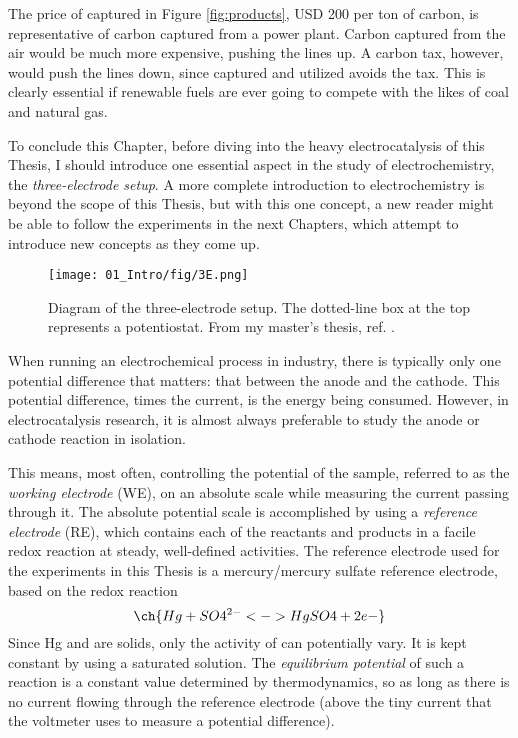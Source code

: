 The price of captured  in Figure \ref{fig:products}, USD 200 per ton of carbon, is representative of carbon captured from a power plant\cite{Majumdar2016}. Carbon captured from the air would be much more expensive, pushing the lines up. A carbon tax, however, would push the lines down, since captured and utilized  avoids the tax. This is clearly essential if renewable fuels are ever going to compete with the likes of coal and natural gas.


\vspace{5mm}
To conclude this Chapter, before diving into the heavy electrocatalysis of this Thesis, I should introduce one essential aspect in the study of electrochemistry, the \textit{three-electrode setup}. A more complete introduction to electrochemistry\cite{Bard2001, Scott2016_MSc} is beyond the scope of this Thesis, but with this one concept, a new reader might be able to follow the experiments in the next Chapters, which attempt to introduce new concepts as they come up.

\begin{figure}[h!]
	\centering
	\texttt{[image: 01\_Intro/fig/3E.png]}
	\caption{Diagram of the three-electrode setup. The dotted-line box at the top represents a potentiostat. From my master's thesis, ref. .}
	\label{fig:3E}
\end{figure}

When running an electrochemical process in industry, there is typically only one potential difference that matters: that between the anode and the cathode. This potential difference, times the current, is the energy being consumed. However, in electrocatalysis research, it is almost always preferable to study the anode or cathode reaction in isolation. 

This means, most often, controlling the potential of the sample, referred to as the \textit{working electrode} (WE), on an absolute scale while measuring the current passing through it. The absolute potential scale is accomplished by using a \textit{reference electrode} (RE), which contains each of the reactants and products in a facile redox reaction at steady, well-defined activities. The reference electrode used for the experiments in this Thesis is a mercury/mercury sulfate reference electrode, based on the redox reaction
\begin{equation}
\ch{Hg + SO4^{2-} <-> HgSO4 + 2 e-}
\end{equation}
Since Hg and  are solids, only the activity of  can potentially vary. It is kept constant by using a saturated  solution. The \textit{equilibrium potential} of such a reaction is a constant value determined by thermodynamics, so as long as there is no current flowing through the reference electrode (above the tiny current that the voltmeter uses to measure a potential difference).

